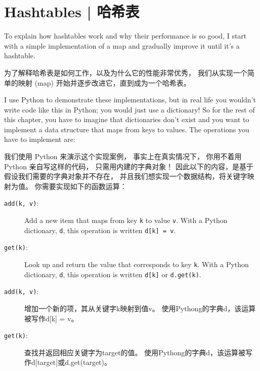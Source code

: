 \section{Hashtables  |  哈希表}
\label{hashtable}

To explain how hashtables work and why their performance is so
good, I start with a simple implementation of a map and
gradually improve it until it's a hashtable.

为了解释哈希表是如何工作，以及为什么它的性能非常优秀，
我们从实现一个简单的映射 (map) 开始并逐步改进它，直到成为一个哈希表。
  

I use Python to demonstrate these implementations, but in real
life you wouldn't write code like this in Python; you would just use a
dictionary!  So for the rest of this chapter, you have to imagine that
dictionaries don't exist and you want to implement a data structure
that maps from keys to values.  The operations you have to
implement are:

我们使用 Python 来演示这个实现案例， 事实上在真实情况下，
你用不着用 Python 亲自写这样的代码， 只需用内建的字典对象！
因此以下的内容，是基于假设我们需要的字典对象并不存在，
并且我们想实现一个数据结构，将关键字映射为值。 你需要实现如下的函数运算：

\begin{description}

\item[{\tt add(k, v)}:] Add a new item that maps from key {\tt k}
to value {\tt v}.  With a Python dictionary, {\tt d}, this operation
is written {\tt d[k] = v}.

\item[{\tt get(k)}:] Look up and return the value that corresponds
to key {\tt k}.  With a Python dictionary, {\tt d}, this operation
is written {\tt d[k]} or {\tt d.get(k)}.

\end{description}

\begin{description}

\item [{\tt add(k, v)}:] 增加一个新的项，其从关键字k映射到值v。 使用Pythong的字典d，该运算被写作d[k] = v。

\item [{\tt get(k)}:] 查找并返回相应关键字为target的值。
 使用Pythong的字典d，该运算被写作d[target]或d.get(target)。

\end{description}

